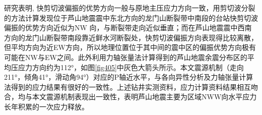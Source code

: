 研究表明, 快剪切波偏振的优势方向一般与原地主压应力方向一致\citep{Gao2011,Gao2012}，用剪切波分裂的方法计算发现位于芦山地震震中东北方向的龙门山断裂带中南段的台站快剪切波偏振的优势方向近似为NW 向，与断裂带走向近似垂直；而在芦山地震震中西南方向的龙门山断裂带南段靠近鲜水河断裂处，快剪切波偏振方向表现得比较离散，但平均方向为近EW方向，所以地理位置位于其中间的震中区的偏振优势方向极有可能在NW与EW之间。此外利用力轴张量法计算得到的芦山地震余震分布区的平均压应力方向约为112°，如图\ref{fig405}中灰色大箭头所示。本文震源机制（走向211°，倾角41°，滑动角94°）对应的P轴近水平，与各向异性分析及力轴张量计算法得到的应力结果有很好的一致性。上述钻井实测资料，应力计算资料结果相互吻合，均与本文震源机制表现出一致性，表明芦山地震主要为区域NWW向水平应力长年积累的一次应力释放。
